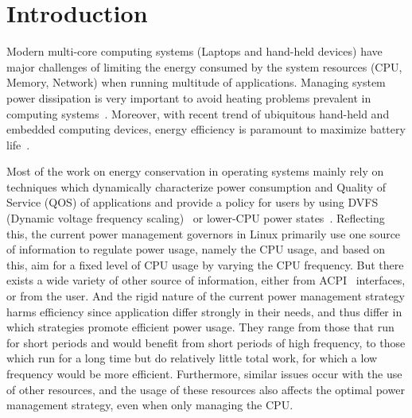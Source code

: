 \section{Introduction}\label{sec:intro}\label{sec:motiv}

Modern multi-core computing systems (Laptops and hand-held devices) have major 
challenges of limiting the energy consumed by the system resources (CPU, Memory, Network) 
when running multitude of applications. 
Managing system power dissipation is very 
important to avoid heating problems prevalent in computing systems~\cite{hybdtm}.
Moreover, with recent trend of ubiquitous hand-held and embedded computing devices,
energy efficiency is paramount to maximize battery life~\cite{martin-bat, worldwide}. 

Most of the work on energy conservation in operating systems mainly rely on techniques which 
dynamically characterize power consumption and Quality of Service (QOS) 
of applications and provide a policy for users by 
using DVFS (Dynamic voltage frequency scaling)~\cite{dvfs} or lower-CPU power states~\cite{sleepscale, ecos}.
Reflecting this, the current power management governors in Linux primarily use one source of 
information to regulate power usage, namely the CPU usage, 
and based on this, aim for a fixed level of CPU usage by varying the 
CPU frequency. But there exists a wide variety of other 
source of information, either from ACPI~\cite{acpi, freqgov} interfaces, 
or from the user. And the rigid nature of the current power 
management strategy harms efficiency since 
application differ strongly in their needs, and thus 
differ in which strategies promote efficient power usage. 
They range from those that run for short periods and would 
benefit from short periods of high frequency, to those which 
run for a long time but do relatively little total work, for 
which a low frequency would be more efficient. 
Furthermore, similar issues occur with the use of other resources, 
and the usage of these resources also affects the optimal 
power management strategy, even when only managing the CPU.

